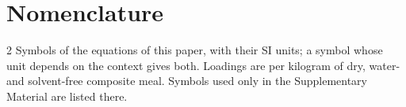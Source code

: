 \documentclass[11pt]{article}
\begin{document}
\clearpage
{\footnotesize
\setlength{\parindent}{0pt}
\setlength{\columnsep}{16pt}
\newcommand{\nomblock}[1]{\par\smallskip{\small\itshape #1}\par\nopagebreak\smallskip\nopagebreak}
\newcommand{\nomitem}[2]{\par\hangindent=1.5em\hangafter=1 #1\enspace #2\par}
\section*{Nomenclature}\label{sec:nomenclature}
\begin{multicols}{2}
Symbols of the equations of this paper, with their SI units; a symbol whose
unit depends on the context gives both. Loadings are per kilogram of dry,
water- and solvent-free composite meal. Symbols used only in the
Supplementary Material are listed there.


\end{multicols}}
\end{document}
